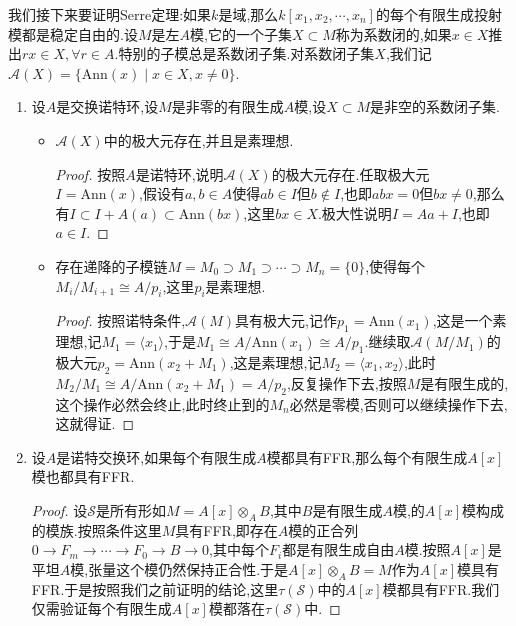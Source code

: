 我们接下来要证明Serre定理:如果$k$是域,那么$k[x_1,x_2,\cdots,x_n]$的每个有限生成投射模都是稳定自由的.设$M$是左$A$模,它的一个子集$X\subset M$称为系数闭的,如果$x\in X$推出$rx\in X,\forall r\in A$.特别的子模总是系数闭子集.对系数闭子集$X$,我们记$\mathscr{A}(X)=\{\mathrm{Ann}(x)\mid x\in X,x\not=0\}$.
\begin{enumerate}
	\item 设$A$是交换诺特环,设$M$是非零的有限生成$A$模,设$X\subset M$是非空的系数闭子集.
	\begin{itemize}
		\item $\mathscr{A}(X)$中的极大元存在,并且是素理想.
		\begin{proof}
			
			按照$A$是诺特环,说明$\mathscr{A}(X)$的极大元存在.任取极大元$I=\mathrm{Ann}(x)$,假设有$a,b\in A$使得$ab\in I$但$b\not\in I$,也即$abx=0$但$bx\not=0$,那么有$I\subset I+A(a)\subset\mathrm{Ann}(bx)$,这里$bx\in X$.极大性说明$I=Aa+I$,也即$a\in I$.
		\end{proof}
	    \item 存在递降的子模链$M=M_0\supset M_1\supset\cdots\supset M_n=\{0\}$,使得每个$M_i/M_{i+1}\cong A/p_i$,这里$p_i$是素理想.
	    \begin{proof}
	    	
	    	按照诺特条件,$\mathscr{A}(M)$具有极大元,记作$p_1=\mathrm{Ann}(x_1)$,这是一个素理想,记$M_1=\langle x_1\rangle$,于是$M_1\cong A/\mathrm{Ann}(x_1)\cong A/p_1$.继续取$\mathscr{A}(M/M_1)$的极大元$p_2=\mathrm{Ann}(x_2+M_1)$,这是素理想,记$M_2=\langle x_1,x_2\rangle$,此时$M_2/M_1\cong A/\mathrm{Ann}(x_2+M_1)=A/p_2$,反复操作下去,按照$M$是有限生成的,这个操作必然会终止,此时终止到的$M_n$必然是零模,否则可以继续操作下去,这就得证.
	    \end{proof}
	\end{itemize}
    \item 设$A$是诺特交换环,如果每个有限生成$A$模都具有FFR,那么每个有限生成$A[x]$模也都具有FFR.
    \begin{proof}
    	
    	设$\mathscr{S}$是所有形如$M=A[x]\otimes_AB$,其中$B$是有限生成$A$模,的$A[x]$模构成的模族.按照条件这里$M$具有FFR,即存在$A$模的正合列$0\to F_m\to\cdots\to F_0\to B\to0$,其中每个$F_i$都是有限生成自由$A$模.按照$A[x]$是平坦$A$模,张量这个模仍然保持正合性.于是$A[x]\otimes_AB=M$作为$A[x]$模具有FFR.于是按照我们之前证明的结论,这里$\tau(\mathscr{S})$中的$A[x]$模都具有FFR.我们仅需验证每个有限生成$A[x]$模都落在$\tau(\mathscr{S})$中.
    	

\end{proof}
\end{enumerate}
